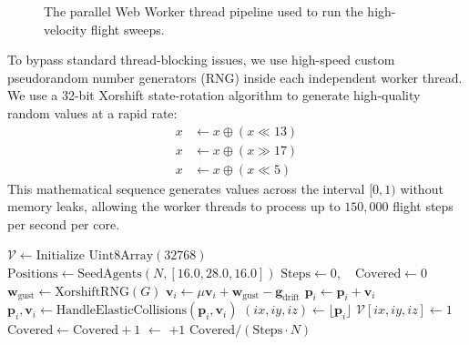 \documentclass[letterpaper, 10pt, conference]{IEEEtran}
\begin{document}
\begin{figure}[H]
\centering
{}
\caption{The parallel Web Worker thread pipeline used to run the high-velocity flight sweeps.}
\label{fig:multithread}
\end{figure}

To bypass standard thread-blocking issues, we use high-speed custom pseudorandom number generators (RNG) inside each independent worker thread. We use a 32-bit Xorshift state-rotation algorithm to generate high-quality random values at a rapid rate:
\begin{align}
    x &\leftarrow x \oplus (x \ll 13) \nonumber \\
    x &\leftarrow x \oplus (x \gg 17) \label{eq:xorshift} \\
    x &\leftarrow x \oplus (x \ll 5) \nonumber
\end{align}
This mathematical sequence generates values across the interval $[0, 1)$ without memory leaks, allowing the worker threads to process up to $150{,}000$ flight steps per second per core.

\begin{algorithm}[H]
\caption{Vel-v5.0 Volumetric Coverage Loop}
\label{alg:simulation_loop}
\begin{algorithmic}[1]
    \State $\mathcal{V} \gets \text{Initialize Uint8Array}(32768)$
    \State $\text{Positions} \gets \text{SeedAgents}(N, [16.0, 28.0, 16.0])$
    \State $\text{Steps} \gets 0, \quad \text{Covered} \gets 0$
            \State $\mathbf{w}_{\text{gust}} \gets \text{XorshiftRNG}(G)$
            \State $\mathbf{v}_i \gets \mu \mathbf{v}_i + \mathbf{w}_{\text{gust}} - \mathbf{g}_{\text{drift}}$
            \State $\mathbf{p}_i \gets \mathbf{p}_i + \mathbf{v}_i$
            \State $\mathbf{p}_i, \mathbf{v}_i \gets \text{HandleElasticCollisions}(\mathbf{p}_i, \mathbf{v}_i)$
            \State $(ix, iy, iz) \gets \lfloor\mathbf{p}_i\rfloor$
                \State $\mathcal{V}[ix, iy, iz] \gets 1$
                \State $\text{Covered} \gets \text{Covered} + 1$
            \EndIf
        \EndFor
        \State {} $\gets$  $+ 1$
    \EndWhile
    \State \Return $\text{Covered} / (\text{Steps} \cdot N)$
\EndProcedure
\end{algorithmic}
\end{algorithm}
\end{document}
